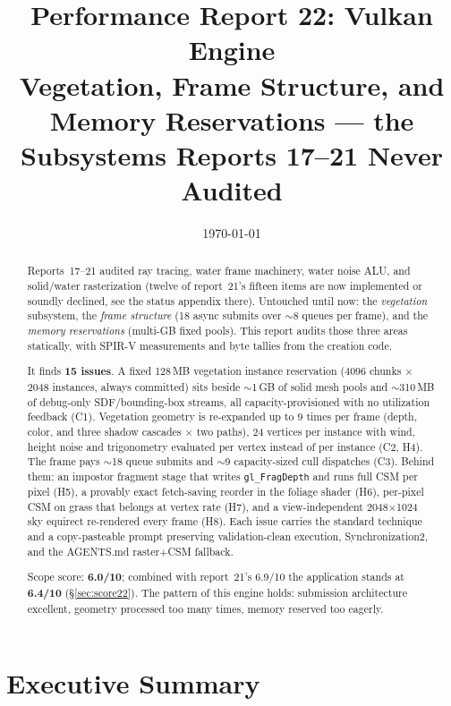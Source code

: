 \documentclass[11pt,a4paper]{article}
\title{Performance Report 22: Vulkan Engine \\
\large Vegetation, Frame Structure, and Memory Reservations --- the Subsystems Reports 17--21 Never Audited}
\author{}
\date{\today}
\begin{document}
\maketitle

\begin{abstract}
Reports~17--21 audited ray tracing, water frame machinery, water noise ALU,
and solid/water rasterization (twelve of report~21's fifteen items are now
implemented or soundly declined, see the status appendix there). Untouched
until now: the \emph{vegetation} subsystem, the \emph{frame structure} (18
async submits over $\sim$8 queues per frame), and the \emph{memory
reservations} (multi-GB fixed pools). This report audits those three areas
statically, with SPIR-V measurements and byte tallies from the creation code.

It finds \textbf{15 issues}. A fixed 128\,MB vegetation instance reservation
(4096 chunks $\times$ 2048 instances, always committed) sits beside $\sim$1\,GB
of solid mesh pools and $\sim$310\,MB of debug-only SDF/bounding-box streams,
all capacity-provisioned with no utilization feedback (C1). Vegetation
geometry is re-expanded up to 9 times per frame (depth, color, and three
shadow cascades $\times$ two paths), 24 vertices per instance with wind,
height noise and trigonometry evaluated per vertex instead of per instance
(C2, H4). The frame pays $\sim$18 queue submits and $\sim$9 capacity-sized
cull dispatches (C3). Behind them: an impostor fragment stage that writes
\texttt{gl\_FragDepth} and runs full CSM per pixel (H5), a provably exact
fetch-saving reorder in the foliage shader (H6), per-pixel CSM on grass that
belongs at vertex rate (H7), and a view-independent 2048$\times$1024 sky
equirect re-rendered every frame (H8). Each issue carries the standard
technique and a copy-pasteable prompt preserving validation-clean execution,
Synchronization2, and the AGENTS.md raster$+$CSM fallback.

Scope score: \textbf{6.0/10}; combined with report~21's 6.9/10 the application
stands at \textbf{6.4/10} (\S\ref{sec:score22}). The pattern of this engine
holds: submission architecture excellent, geometry processed too many times,
memory reserved too eagerly.
\end{abstract}

\tableofcontents
\newpage

\section{Executive Summary}
\end{document}
